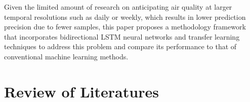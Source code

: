 \documentclass[a4paper, fleqn]{cas-sc}
\theoremstyle{definition}
\theoremstyle{remark}
\begin{document}
Given the limited amount of research on anticipating air quality at larger temporal resolutions such as daily or weekly,  which results in lower prediction precision due to fewer samples,  this paper proposes a methodology framework that incorporates bidirectional LSTM neural networks and transfer learning techniques to address this problem and compare its performance to that of conventional machine learning methods.

\section{Review of Literatures}
\end{document}
